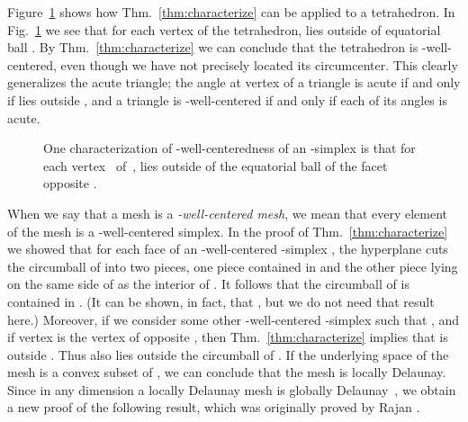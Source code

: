 \documentclass[final]{siamltex}
\begin{document}
\bigskip

Figure~\ref{fig:eqballsxmpl} shows how Thm.~\ref{thm:characterize} can
be applied to a tetrahedron.  In Fig.~\ref{fig:eqballsxmpl} we see
that for each vertex  of the tetrahedron,  lies outside
of equatorial ball .  By Thm.~\ref{thm:characterize} we can
conclude that the tetrahedron is -well-centered, even though we
have not precisely located its circumcenter.  This clearly generalizes
the acute triangle; the angle at vertex  of a triangle is acute
if and only if  lies outside , and a triangle is
-well-centered if and only if each of its angles is acute.

\begin{figure}
  \centering
  \caption{One characterization of -well-centeredness of an
    -simplex  is that for each vertex~
    of~,  lies outside of the equatorial ball
     of the facet  opposite .}
\label{fig:eqballsxmpl}
\end{figure}

When we say that a mesh is a {\emph{-well-centered
    mesh}}, we mean that every element of the mesh is a
-well-centered simplex.  In the proof of
Thm.~\ref{thm:characterize} we showed that for each face
 of an -well-centered -simplex ,
the hyperplane  cuts the circumball of
 into two pieces, one piece contained in  and
the other piece lying on the same side of  as
the interior of .  It follows that the circumball of
 is contained in .  (It can be shown, in fact, that , but we do not need that result here.)
Moreover, if we consider some other -well-centered
  -simplex  such that , and if vertex  is the vertex of
 opposite , then
Thm.~\ref{thm:characterize} implies that  is outside .
Thus  also lies outside the circumball of .  If the
underlying space of the mesh is a convex subset of , we can
conclude that the mesh is locally Delaunay.  Since in any dimension a
locally Delaunay mesh is globally Delaunay~\cite{EdSh1996}, we obtain
a new proof of the following result, which was originally proved by
Rajan \cite{Rajan1994}.
\end{document}
